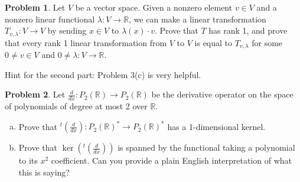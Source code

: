 \documentclass[11pt,oneside]{amsart}
\theoremstyle{definition}
\newtheorem{problem}{Problem}
\newcommand{\bR}{\mathbb{R}}
\newcommand{\eps}{\varepsilon}
\begin{document}
    \begin{problem}
        Let $V$ be a vector space. Given a nonzero element $v\in V$ and a nonzero linear functional $\lambda\colon V\to \bR$, we can make a linear transformation $T_{v,\lambda}\colon V\to V$ by sending $x\in V$ to $\lambda(x)\cdot v$. Prove that $T$ has rank 1, and prove that every rank 1 linear transformation from $V$ to $V$ is equal to $T_{v,\lambda}$ for some $0\neq v\in V$ and $0\neq \lambda\colon V\to \bR$.

        Hint for the second part: Problem 3(c) is very helpful.
    \end{problem}

    \begin{problem}
        Let $\frac d{dx}\colon P_2(\bR)\to P_2(\bR)$ be the derivative operator on the space of polynomials of degree at most 2 over $\bR$.
        \begin{enumerate}[(a)]
            \item Prove that $^t(\frac d{dx})\colon P_2(\bR)^*\to P_2(\bR)^*$ has a 1-dimensional kernel.
            \item Prove that $\ker(^t(\frac d{dx}))$ is spanned by the functional taking a polynomial to its $x^2$ coefficient. Can you provide a plain English interpretation of what this is saying?
        \end{enumerate}
    \end{problem}
\end{document}
